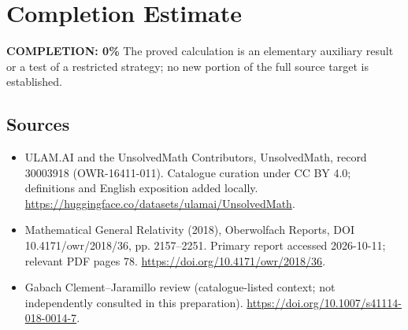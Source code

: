 \documentclass[11pt]{article}
\begin{document}
\section{Completion Estimate}
\noindent\textbf{COMPLETION: 0\%}
The proved calculation is an elementary auxiliary result or a test of a restricted strategy; no new portion of the full source target is established.

\subsection{Sources}
\begin{itemize}
\item[\hypertarget{source:30003918:1}{S1}] ULAM.AI and the UnsolvedMath Contributors, UnsolvedMath, record 30003918 (OWR-16411-011). Catalogue curation under CC BY 4.0; definitions and English exposition added locally.
\url{https://huggingface.co/datasets/ulamai/UnsolvedMath}.
\item[\hypertarget{source:30003918:2}{S2}] Mathematical General Relativity (2018), Oberwolfach Reports, DOI 10.4171/owr/2018/36, pp. 2157--2251. Primary report accessed 2026-10-11; relevant PDF pages 78.
\url{https://doi.org/10.4171/owr/2018/36}.
\item[\hypertarget{source:30003918:3}{S3}] Gabach Clement--Jaramillo review (catalogue-listed context; not independently consulted in this preparation).
\url{https://doi.org/10.1007/s41114-018-0014-7}.
\end{itemize}
\label{end:30003918}
\end{document}
